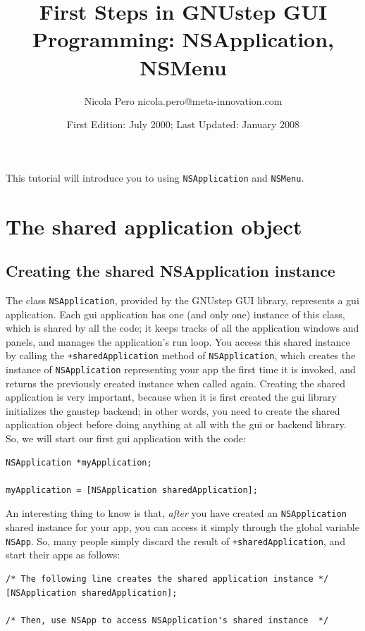 \documentclass[a4paper]{article}
\begin{document}
\author{Nicola Pero nicola.pero@meta-innovation.com}
\title{First Steps in GNUstep GUI Programming: NSApplication, NSMenu}
\date{First Edition: July 2000; Last Updated: January 2008}
\maketitle

This tutorial will introduce you to using \texttt{NSApplication} and
\texttt{NSMenu}.

\section{The shared application object}
\subsection{Creating the shared NSApplication instance}
The class \texttt{NSApplication}, provided by the GNUstep GUI library,
represents a gui application.  Each gui application has one (and only
one) instance of this class, which is shared by all the code; it keeps
tracks of all the application windows and panels, and manages the
application's run loop.  You access this shared instance by calling
the \texttt{+sharedApplication} method of \texttt{NSApplication},
which creates the instance of \texttt{NSApplication} representing your
app the first time it is invoked, and returns the previously created
instance when called again.  Creating the shared application is very
important, because when it is first created the gui library
initializes the gnustep backend; in other words, you need to create
the shared application object before doing anything at all with the
gui or backend library.  So, we will start our first gui application
with the code:
\begin{verbatim}
NSApplication *myApplication;

myApplication = [NSApplication sharedApplication];
\end{verbatim}
An interesting thing to know is that, \emph{after} you have created an 
\texttt{NSApplication} shared instance for your app, you can access 
it simply through the global variable \texttt{NSApp}.  So, many 
people simply discard the result of \texttt{+sharedApplication}, 
and start their apps as follows: 
\begin{verbatim}
/* The following line creates the shared application instance */
[NSApplication sharedApplication];

/* Then, use NSApp to access NSApplication's shared instance  */
\end{verbatim}
\end{document}

